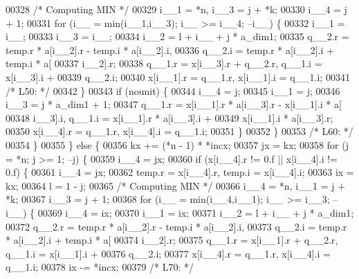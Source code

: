\begin{DoxyCode}
00328 \textcolor{comment}{/* Computing MIN */}
00329             i\_\_1 = *n, i\_\_3 = j + *k;
00330             i\_\_4 = j + 1;
00331             \textcolor{keywordflow}{for} (i\_\_ = min(i\_\_1,i\_\_3); i\_\_ >= i\_\_4; --i\_\_) \{
00332                 i\_\_1 = i\_\_;
00333                 i\_\_3 = i\_\_;
00334                 i\_\_2 = l + i\_\_ + j * a\_dim1;
00335                 q\_\_2.r = temp.r * a[i\_\_2].r - temp.i * a[i\_\_2].i, 
00336                     q\_\_2.i = temp.r * a[i\_\_2].i + temp.i * a[
00337                     i\_\_2].r;
00338                 q\_\_1.r = x[i\_\_3].r + q\_\_2.r, q\_\_1.i = x[i\_\_3].i + 
00339                     q\_\_2.i;
00340                 x[i\_\_1].r = q\_\_1.r, x[i\_\_1].i = q\_\_1.i;
00341 \textcolor{comment}{/* L50: */}
00342             \}
00343             \textcolor{keywordflow}{if} (nounit) \{
00344                 i\_\_4 = j;
00345                 i\_\_1 = j;
00346                 i\_\_3 = j * a\_dim1 + 1;
00347                 q\_\_1.r = x[i\_\_1].r * a[i\_\_3].r - x[i\_\_1].i * a[
00348                     i\_\_3].i, q\_\_1.i = x[i\_\_1].r * a[i\_\_3].i + 
00349                     x[i\_\_1].i * a[i\_\_3].r;
00350                 x[i\_\_4].r = q\_\_1.r, x[i\_\_4].i = q\_\_1.i;
00351             \}
00352             \}
00353 \textcolor{comment}{/* L60: */}
00354         \}
00355         \} \textcolor{keywordflow}{else} \{
00356         kx += (*n - 1) * *incx;
00357         jx = kx;
00358         \textcolor{keywordflow}{for} (j = *n; j >= 1; --j) \{
00359             i\_\_4 = jx;
00360             \textcolor{keywordflow}{if} (x[i\_\_4].r != 0.f || x[i\_\_4].i != 0.f) \{
00361             i\_\_4 = jx;
00362             temp.r = x[i\_\_4].r, temp.i = x[i\_\_4].i;
00363             ix = kx;
00364             l = 1 - j;
00365 \textcolor{comment}{/* Computing MIN */}
00366             i\_\_4 = *n, i\_\_1 = j + *k;
00367             i\_\_3 = j + 1;
00368             \textcolor{keywordflow}{for} (i\_\_ = min(i\_\_4,i\_\_1); i\_\_ >= i\_\_3; --i\_\_) \{
00369                 i\_\_4 = ix;
00370                 i\_\_1 = ix;
00371                 i\_\_2 = l + i\_\_ + j * a\_dim1;
00372                 q\_\_2.r = temp.r * a[i\_\_2].r - temp.i * a[i\_\_2].i, 
00373                     q\_\_2.i = temp.r * a[i\_\_2].i + temp.i * a[
00374                     i\_\_2].r;
00375                 q\_\_1.r = x[i\_\_1].r + q\_\_2.r, q\_\_1.i = x[i\_\_1].i + 
00376                     q\_\_2.i;
00377                 x[i\_\_4].r = q\_\_1.r, x[i\_\_4].i = q\_\_1.i;
00378                 ix -= *incx;
00379 \textcolor{comment}{/* L70: */}

\end{DoxyCode}
